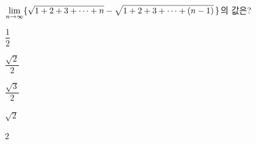$\displaystyle\lim_{n\to\infty}\{\sqrt{1+2+3+\cdots+n}-\sqrt{1+2+3+\cdots+(n-1)}\mkern3mu \}$의 값은?
\begin{choices32}{\rule[-3ex]{0pt}{8ex}$\dfrac{1}{2}$}{\rule[-3ex]{0pt}{8ex}$\dfrac{\sqrt{2}}{2}$}{\rule[-3ex]{0pt}{8ex}$\dfrac{\sqrt{3}}{2}$}{\rule[-3ex]{0pt}{8ex}$\sqrt{2}$}{\rule[-3ex]{0pt}{8ex}$2$}\end{choices32}
